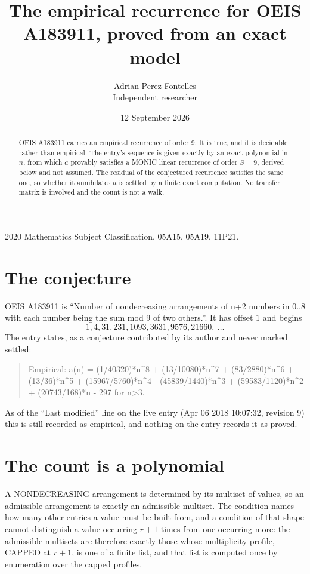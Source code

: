 \documentclass[11pt,a4paper]{article}
\title{The empirical recurrence for OEIS A183911, proved from an exact model}
\author{Adrian Perez Fontelles\\ \small Independent researcher}
\date{12 September 2026}
\theoremstyle{plain}
\theoremstyle{definition}
\begin{document}
\maketitle

\begin{abstract}
OEIS A183911 carries an empirical recurrence of order $9$. It is true, and it is
decidable rather than empirical. The entry's sequence is given exactly by an exact polynomial in $n$, from
which $a$ provably satisfies a MONIC linear recurrence of order $S=9$, derived below and not
assumed. The residual of the conjectured recurrence satisfies the same one, so whether it
annihilates $a$ is settled by a finite exact computation. No transfer matrix is involved and
the count is not a walk.
\end{abstract}

\noindent\small 2020 Mathematics Subject Classification. 05A15, 05A19, 11P21.\normalsize

\section{The conjecture}

OEIS A183911 is ``Number of nondecreasing arrangements of n+2 numbers in 0..8 with each number being the sum mod 9 of two others.''. It has offset $1$ and begins
\[
1, 4, 31, 231, 1093, 3631, 9576, 21660,\ \dots
\]
The entry states, as a conjecture contributed by its author and never marked settled:
\begin{quote}
Empirical: a(n) = (1/40320)*n\^{}8 + (13/10080)*n\^{}7 + (83/2880)*n\^{}6 + (13/36)*n\^{}5 + (15967/5760)*n\^{}4 - (45839/1440)*n\^{}3 + (59583/1120)*n\^{}2 + (20743/168)*n - 297 for n>3.
\end{quote}
As of the ``Last modified'' line on the live entry (Apr 06 2018 10:07:32, revision 9)
this is still recorded as empirical, and nothing on the entry records it as proved.

\section{The count is a polynomial}

A NONDECREASING arrangement is determined by its multiset of values, so an admissible
arrangement is exactly an admissible multiset. The condition names how many other entries a
value must be built from, and a condition of that shape cannot distinguish a value occurring
$r+1$ times from one occurring more: the admissible multisets are therefore exactly those
whose multiplicity profile, CAPPED at $r+1$, is one of a finite list, and that list is computed
once by enumeration over the capped profiles.
\end{document}
